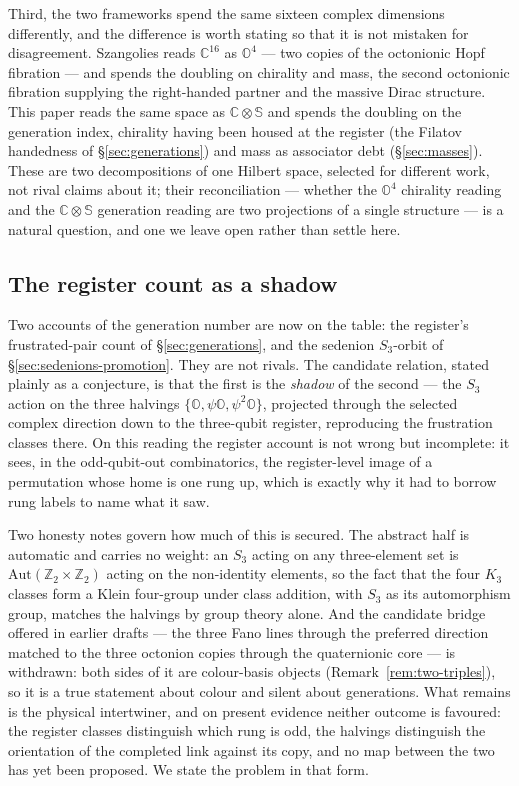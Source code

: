 Third, the two frameworks spend the same sixteen complex dimensions differently, and the difference
is worth stating so that it is not mistaken for disagreement. Szangolies reads $\mathbb{C}^{16}$ as
$\mathbb{O}^4$ --- two copies of the octonionic Hopf fibration --- and spends the doubling on
chirality and mass, the second octonionic fibration supplying the right-handed partner and the
massive Dirac structure. This paper reads the same space as $\mathbb{C}\otimes\mathbb{S}$ and spends
the doubling on the generation index, chirality having been housed at the register (the Filatov
handedness of \S\ref{sec:generations}) and mass as associator debt (\S\ref{sec:masses}). These are
two decompositions of one Hilbert space, selected for different work, not rival claims about it;
their reconciliation --- whether the $\mathbb{O}^4$ chirality reading and the
$\mathbb{C}\otimes\mathbb{S}$ generation reading are two projections of a single structure --- is a
natural question, and one we leave open rather than settle here.

\subsection{The register count as a shadow}
\label{sec:sedenions-shadow}

Two accounts of the generation number are now on the table: the register's frustrated-pair count of
\S\ref{sec:generations}, and the sedenion $S_3$-orbit of \S\ref{sec:sedenions-promotion}. They are
not rivals. The candidate relation, stated plainly as a conjecture, is that the first is the
\emph{shadow} of the second --- the $S_3$ action on the three halvings
$\{\mathbb{O}, \psi\mathbb{O}, \psi^{2}\mathbb{O}\}$, projected through the selected complex
direction down to the three-qubit register, reproducing the frustration classes there. On this
reading the register account is not wrong but incomplete: it sees, in the odd-qubit-out
combinatorics, the register-level image of a permutation whose home is one rung up, which is exactly
why it had to borrow rung labels to name what it saw.

Two honesty notes govern how much of this is secured. The abstract half is automatic and carries no
weight: an $S_3$ acting on any three-element set is $\mathrm{Aut}(\mathbb{Z}_2\times\mathbb{Z}_2)$
acting on the non-identity elements, so the fact that the four $K_3$ classes form a Klein four-group
under class addition, with $S_3$ as its automorphism group, matches the halvings by group theory
alone. And the candidate bridge offered in earlier drafts --- the three Fano lines through the
preferred direction matched to the three octonion copies through the quaternionic core --- is
withdrawn: both sides of it are colour-basis objects (Remark~\ref{rem:two-triples}), so it is a true
statement about colour and silent about generations. What remains is the physical intertwiner, and
on present evidence neither outcome is favoured: the register classes distinguish which rung is odd,
the halvings distinguish the orientation of the completed link against its copy, and no map between
the two has yet been proposed. We state the problem in that form.

